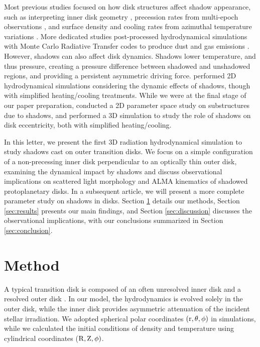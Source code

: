 \documentclass[twocolumn,tighten]{aastex631}
\begin{document}
Most previous studies focused on how disk structures affect shadow appearance, such as interpreting inner disk geometry \citep[e.g.,][]{marino15}, precession rates from multi-epoch observations \citep{pinilla18, debes23}, and surface density and cooling rates from azimuthal temperature variations \citep{cassasus18}. More dedicated studies post-processed hydrodynamical simulations with Monte Carlo Radiative Transfer codes to produce dust and gas emissions \citep{facchini18, nealon19, ballabio21}. However, shadows can also affect disk dynamics. Shadows lower temperature, and thus pressure, creating a pressure difference between shadowed and unshadowed regions, and providing a persistent asymmetric driving force. \cite{montesinos16, montesinos18, cuello19} performed 2D hydrodynamical simulations considering the dynamic effects of shadows, though with simplified heating/cooling treatments. While we were at the final stage of our paper preparation, \citet{su24} conducted a 2D parameter space study on substructures due to shadows, and \citet{qian24} performed a 3D simulation to study the role of shadows on disk eccentricity, both with simplified heating/cooling.

In this letter, we present the first 3D radiation hydrodynamical simulation to study shadows cast on outer transition disks. We focus on a simple configuration of a non-precessing inner disk perpendicular to an optically thin outer disk, examining the dynamical impact by shadows and discuss observational implications on scattered light morphology and ALMA kinematics of shadowed protoplanetary disks. In a subsequent article, we will present a more complete parameter study on shadows in disks. Section \ref{sec:method} details our methods, Section \ref{sec:results} presents our main findings, and Section \ref{sec:discussion} discusses the observational implications, with our conclusions summarized in Section \ref{sec:conclusion}.

\section{Method} \label{sec:method}

A typical transition disk is composed of an often unresolved inner disk and a resolved outer disk \citep{vandermarel23}. In our model, the hydrodynamics is evolved solely in the outer disk, while the inner disk provides asymmetric attenuation of the incident stellar irradiation. We adopted spherical polar coordinates $\rm ({r, \theta, \phi})$ in simulations, while we calculated the initial conditions of density and temperature using cylindrical coordinates ($\rm {R, Z, \phi})$.
\end{document}

